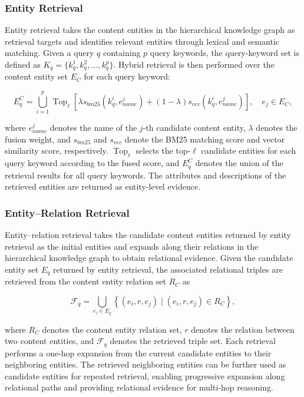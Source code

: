 \documentclass[preprint,12pt,authoryear]{elsarticle}
\begin{document}
\subsubsection{Entity Retrieval}
\label{subsubsec:entity-retrieval}

Entity retrieval takes the content entities in the hierarchical knowledge graph as retrieval targets and identifies relevant entities through lexical and semantic matching. Given a query $q$ containing $p$ query keywords, the query-keyword set is defined as $K_q=\{k_q^1,k_q^2,\ldots,k_q^p\}$. Hybrid retrieval is then performed over the content entity set $E_C$ for each query keyword:

\begin{equation}
E_q^C
=
\bigcup_{i=1}^{p}
\operatorname{Top}_{\ell}
\left[
\lambda s_{bm25}(k_q^i,e_{name}^j)
+
(1-\lambda)s_{vec}(k_q^i,e_{name}^j)
\right],
\quad e_j \in E_C,
\label{eq:entity_retrieval}
\end{equation}

where $e_{name}^j$ denotes the name of the $j$-th candidate content entity, $\lambda$ denotes the fusion weight, and $s_{bm25}$ and $s_{vec}$ denote the BM25 matching score and vector similarity score, respectively. $\operatorname{Top}_{\ell}$ selects the top-$\ell$ candidate entities for each query keyword according to the fused score, and $E_q^C$ denotes the union of the retrieval results for all query keywords. The attributes and descriptions of the retrieved entities are returned as entity-level evidence.

\subsubsection{Entity--Relation Retrieval}
\label{subsubsec:entity-relation-retrieval}

Entity--relation retrieval takes the candidate content entities returned by entity retrieval as the initial entities and expands along their relations in the hierarchical knowledge graph to obtain relational evidence. Given the candidate entity set $E_q$ returned by entity retrieval, the associated relational triples are retrieved from the content entity relation set $R_C$ as


\begin{equation}
\mathcal{F}_q
=
\bigcup_{e_i \in E_q}
\left\{
(e_i,r,e_j)
\mid
(e_i,r,e_j)\in R_C
\right\},
\label{eq:relation_expansion}
\end{equation}

where $R_C$ denotes the content entity relation set, $r$ denotes the relation between two content entities, and $\mathcal{F}_q$ denotes the retrieved triple set. Each retrieval performs a one-hop expansion from the current candidate entities to their neighboring entities. The retrieved neighboring entities can be further used as candidate entities for repeated retrieval, enabling progressive expansion along relational paths and providing relational evidence for multi-hop reasoning.
\end{document}
